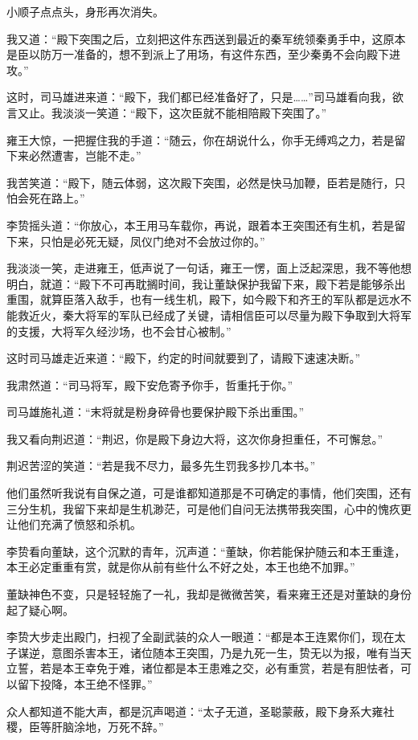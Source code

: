 小顺子点点头，身形再次消失。

我又道：“殿下突围之后，立刻把这件东西送到最近的秦军统领秦勇手中，这原本是臣以防万一准备的，想不到派上了用场，有这件东西，至少秦勇不会向殿下进攻。”

这时，司马雄进来道：“殿下，我们都已经准备好了，只是……”司马雄看向我，欲言又止。我淡淡一笑道：“殿下，这次臣就不能相陪殿下突围了。”

雍王大惊，一把握住我的手道：“随云，你在胡说什么，你手无缚鸡之力，若是留下来必然遭害，岂能不走。”

我苦笑道：“殿下，随云体弱，这次殿下突围，必然是快马加鞭，臣若是随行，只怕会死在路上。”

李贽摇头道：“你放心，本王用马车载你，再说，跟着本王突围还有生机，若是留下来，只怕是必死无疑，凤仪门绝对不会放过你的。”

我淡淡一笑，走进雍王，低声说了一句话，雍王一愣，面上泛起深思，我不等他想明白，就道：“殿下不可再耽搁时间，我让董缺保护我留下来，殿下若是能够杀出重围，就算臣落入敌手，也有一线生机，殿下，如今殿下和齐王的军队都是远水不能救近火，秦大将军的军队已经成了关键，请相信臣可以尽量为殿下争取到大将军的支援，大将军久经沙场，也不会甘心被制。”

这时司马雄走近来道：“殿下，约定的时间就要到了，请殿下速速决断。”

我肃然道：“司马将军，殿下安危寄予你手，哲重托于你。”

司马雄施礼道：“末将就是粉身碎骨也要保护殿下杀出重围。”

我又看向荆迟道：“荆迟，你是殿下身边大将，这次你身担重任，不可懈怠。”

荆迟苦涩的笑道：“若是我不尽力，最多先生罚我多抄几本书。”

他们虽然听我说有自保之道，可是谁都知道那是不可确定的事情，他们突围，还有三分生机，我留下来却是生机渺茫，可是他们自问无法携带我突围，心中的愧疚更让他们充满了愤怒和杀机。

李贽看向董缺，这个沉默的青年，沉声道：“董缺，你若能保护随云和本王重逢，本王必定重重有赏，就是你从前有些什么不好之处，本王也绝不加罪。”

董缺神色不变，只是轻轻施了一礼，我却是微微苦笑，看来雍王还是对董缺的身份起了疑心啊。

李贽大步走出殿门，扫视了全副武装的众人一眼道：“都是本王连累你们，现在太子谋逆，意图杀害本王，诸位随本王突围，乃是九死一生，贽无以为报，唯有当天立誓，若是本王幸免于难，诸位都是本王患难之交，必有重赏，若是有胆怯者，可以留下投降，本王绝不怪罪。”

众人都知道不能大声，都是沉声喝道：“太子无道，圣聪蒙蔽，殿下身系大雍社稷，臣等肝脑涂地，万死不辞。”

